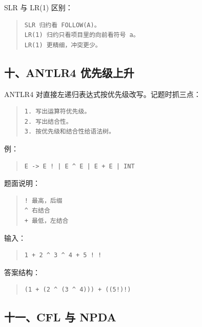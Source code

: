 \documentclass[UTF8,zihao=-4]{ctexart}
\begin{document}
SLR 与 LR(1) 区别：


\begin{quote}
\footnotesize
\begin{verbatim}
SLR 归约看 FOLLOW(A)。
LR(1) 归约只看项目里的向前看符号 a。
LR(1) 更精细，冲突更少。
\end{verbatim}
\end{quote}


\subsection{十、ANTLR4 优先级上升}


ANTLR4 对直接左递归表达式按优先级改写。记题时抓三点：


\begin{quote}
\footnotesize
\begin{verbatim}
1. 写出运算符优先级。
2. 写出结合性。
3. 按优先级和结合性给语法树。
\end{verbatim}
\end{quote}


例：


\begin{quote}
\footnotesize
\begin{verbatim}
E -> E ! | E ^ E | E + E | INT
\end{verbatim}
\end{quote}


题面说明：


\begin{quote}
\footnotesize
\begin{verbatim}
! 最高，后缀
^ 右结合
+ 最低，左结合
\end{verbatim}
\end{quote}


输入：


\begin{quote}
\footnotesize
\begin{verbatim}
1 + 2 ^ 3 ^ 4 + 5 ! !
\end{verbatim}
\end{quote}


答案结构：


\begin{quote}
\footnotesize
\begin{verbatim}
(1 + (2 ^ (3 ^ 4))) + ((5!)!)
\end{verbatim}
\end{quote}


\subsection{十一、CFL 与 NPDA}
\end{document}
